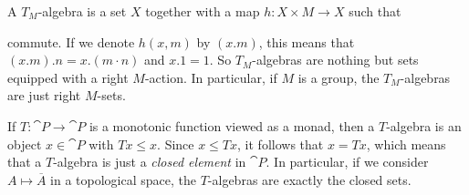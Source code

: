 \begin{example}
    A $T_M$-algebra is a set $X$ together with a map $h \colon X \times M \to X$
    such that 
    \begin{figure}[H]
        \centering
        \begin{subfigure}{0.4\textwidth}
        \centering
        \end{subfigure}
        \hspace{2em}
        \begin{subfigure}{0.4\textwidth}
        \centering
        \end{subfigure}
        \end{figure}
        commute. If we denote $h(x,m)$ by $(x . m)$, this means that
        $(x . m) . n = x . (m \cdot n)$ and $x . 1 = 1$.
        So $T_M$-algebras are nothing but sets equipped with a right $M$-action.
        In particular, if $M$ is a group, the $T_M$-algebras are just right $M$-sets.
\end{example}
\begin{example}[preorder]
    If $T \colon \cat{P} \to \cat{P}$ is a monotonic function viewed as a monad, then a $T$-algebra is
    an object $x \in \cat{P}$ with $Tx \leq x$. Since $x \leq Tx$, it follows that $x = Tx$, which means that
    a $T$-algebra is just a \textit{closed element} in $\cat{P}$.
    In particular, if we consider $A \mapsto \overline{A}$ in a topological space,
    the $T$-algebras are exactly the closed sets.
\end{example}

